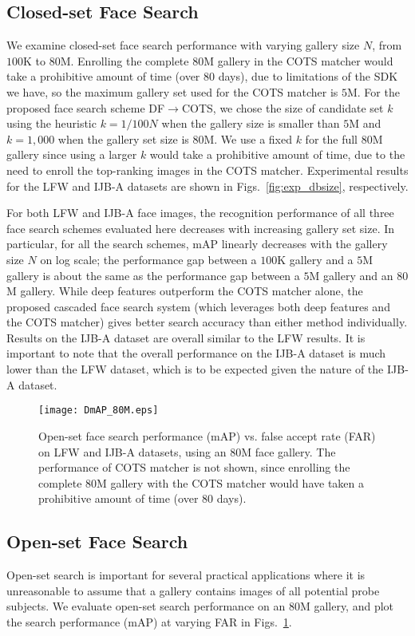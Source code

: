 \documentclass[10pt,journal,compsoc]{IEEEtran}
\begin{document}
\subsection{Closed-set Face Search}
We examine closed-set face search performance with varying gallery size $N$, from $100$K to $80$M. Enrolling the complete $80$M gallery in the COTS matcher would take a prohibitive amount of time (over $80$ days), due to limitations of the SDK we have, so the maximum gallery set used for the COTS matcher is $5$M. For the proposed face search scheme DF$\rightarrow$COTS, we chose the size of candidate set $k$ using the heuristic $k=1/100N$ when the gallery size is smaller than $5$M and $k=1,000$ when the gallery set size is $80$M. We use a fixed $k$ for the full $80$M gallery since using a  larger $k$ would take a prohibitive amount of time, due to the need to enroll the top-ranking images in the COTS matcher. Experimental results for the LFW and IJB-A datasets are shown in Figs.~\ref{fig:exp_dbsize}, respectively.

For both LFW and IJB-A face images, the recognition performance of all three face search schemes evaluated here decreases with increasing gallery set size. In particular, for all the search schemes, mAP linearly decreases with the gallery size $N$ on log scale; the performance gap between a $100$K gallery and a $5$M gallery is about the same as the performance gap between a $5$M gallery and an $80$M gallery. While deep features outperform the COTS matcher alone, the proposed cascaded face search system (which leverages both deep features and the COTS matcher) gives better search accuracy than either method individually. Results on the IJB-A dataset are overall similar to the LFW results. It is important to note that the overall performance on the IJB-A dataset is much lower than the LFW dataset, which is to be expected given the nature of the IJB-A dataset.
\begin{figure}[htbp]
  \centering
  \texttt{[image: DmAP\_80M.eps]}
  \caption{Open-set face search performance (mAP) vs. false accept rate (FAR) on LFW and IJB-A datasets, using an $80$M face gallery. The performance of COTS matcher is not shown, since enrolling the complete $80$M gallery with the COTS matcher would have taken a prohibitive amount of time (over $80$ days).}
  \label{fig:exp_openset}
\end{figure}

\subsection{Open-set Face Search}
Open-set search is important for several practical applications where it is unreasonable to assume that a gallery contains images of all potential probe subjects. We evaluate open-set search performance on an $80$M gallery, and plot the search performance (mAP) at varying FAR in Figs.~\ref{fig:exp_openset}.
\end{document}
